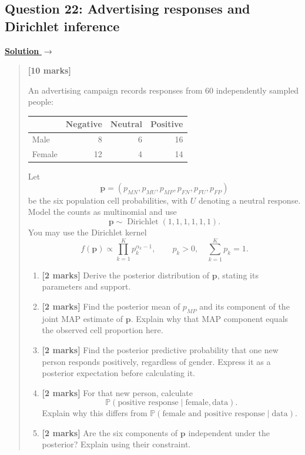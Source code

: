 \documentclass[11pt,a4paper]{article}
\newenvironment{examquestion}[2]
  {\subsection{#1}\label{question:\arabic{subsection}}\label{#2}%
   \noindent\hyperref[answer:\arabic{subsection}]{\textbf{Solution} $\rightarrow$}%
   \begin{quote}\color{statgrey}}
  {\end{quote}}
\begin{document}
\begin{examquestion}{Question 22: Advertising responses and Dirichlet inference}{question:practice-advertising-responses-and-dirichlet-inference}
\textbf{[10 marks]}

An advertising campaign records responses from 60 independently sampled
people:
\begin{center}
\begin{tabular}{lrrr}
\hline
 & Negative & Neutral & Positive\\
\hline
Male   & 8  & 6 & 16\\
Female & 12 & 4 & 14\\
\hline
\end{tabular}
\end{center}
Let
\[
\mathbf p=(p_{MN},p_{MU},p_{MP},p_{FN},p_{FU},p_{FP})
\]
be the six population cell probabilities, with $U$ denoting a neutral
response. Model the counts as multinomial and use
\[
\mathbf p\sim\operatorname{Dirichlet}(1,1,1,1,1,1).
\]
You may use the Dirichlet kernel
\[
f(\mathbf p)\propto\prod_{k=1}^{K}p_k^{\alpha_k-1},
\qquad p_k>0,\quad \sum_{k=1}^{K}p_k=1.
\]
\begin{enumerate}[label=(\alph*)]
  \item \textbf{[2 marks]} Derive the posterior distribution of $\mathbf p$,
        stating its parameters and support.
  \item \textbf{[2 marks]} Find the posterior mean of $p_{MP}$ and its
        component of the joint MAP estimate of $\mathbf p$. Explain why
        that MAP component equals the observed cell proportion here.
  \item \textbf{[2 marks]} Find the posterior predictive probability that
        one new person responds positively, regardless of gender. Express
        it as a posterior expectation before calculating it.
  \item \textbf{[2 marks]} For that new person, calculate
        \[
        \mathbb{P}(\text{positive response}\mid\text{female},\text{data}).
        \]
        Explain why this differs from
        $\mathbb{P}(\text{female and positive response}\mid\text{data})$.
  \item \textbf{[2 marks]} Are the six components of $\mathbf p$ independent
        under the posterior? Explain using their constraint.
\end{enumerate}
\end{examquestion}

\clearpage
\end{document}
